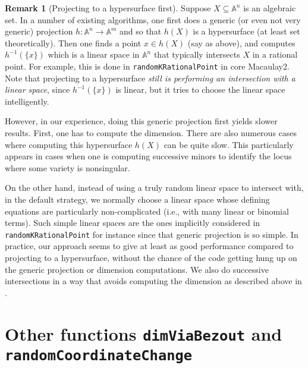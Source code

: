 \documentclass[11pt]{amsart}
\theoremstyle{definition}
\newtheorem{remark}{Remark}[subsection]
\newcommand{\bA}{\mathbb{A}}
\begin{document}
\begin{remark}[Projecting to a hypersurface first]
    \label{rem.ProjectingToAHypersurfaceFirst}
    Suppose $X \subseteq \bA^n$ is an algebraic set.  In a number of existing algorithms, one first does a generic (or even not very generic) projection $h : \bA^n \to \bA^m$ and so that $h(X)$ is a hypersurface (at least set theoretically).  Then one finds a point $x \in h(X)$ (say as above), and computes $h^{-1}(\{ x \})$ which is a linear space in $\bA^n$ that typically intersects $X$ in a rational point.   For example, this is done in {\tt randomKRationalPoint} in core Macaulay2.  Note that projecting to a hypersurface \emph{still is performing an intersection with a linear space}, since $h^{-1}(\{ x \})$ is linear, but it tries to choose the linear space intelligently.

    However, in our experience, doing this generic projection first yields slower results. First, one has to compute the dimension.  There are also numerous cases where computing this hypersurface $h(X)$ can be quite slow.  This particularly appears in cases when one is computing successive minors to identify the locus where some variety is nonsingular.  

    On the other hand, instead of using a truly random linear space to intersect with, in the default strategy, we normally choose a linear space whose defining equations are particularly non-complicated (i.e., with many linear or binomial terms).  Such simple linear spaces are the ones implicitly considered in {\tt randomKRationalPoint} for instance since that generic projection is so simple.  In practice, our approach seems to give at least as good performance compared to projecting to a hypersurface, without the chance of the code getting hung up on the generic projection or dimension computations.  We also do successive intersections in a way that avoids computing the dimension as described above in .
\end{remark}


\section{Other functions {\tt dimViaBezout} and {\tt randomCoordinateChange}}{\label{helper}}
\end{document}

